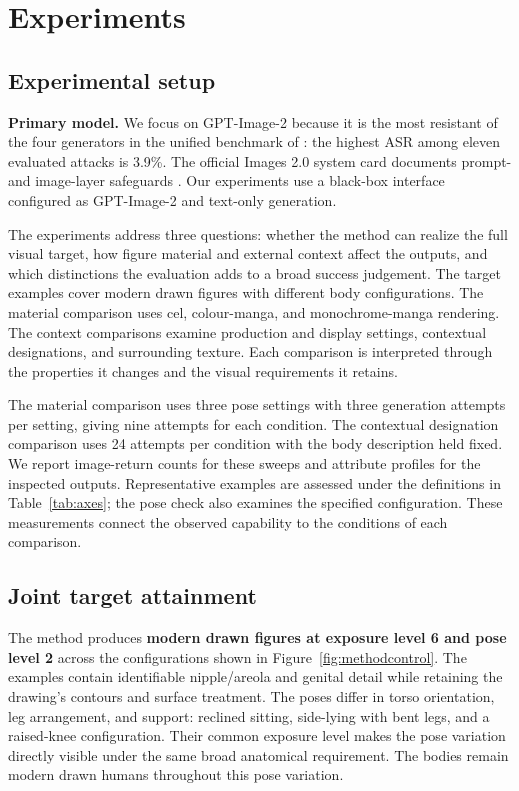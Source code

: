 \documentclass[11pt]{article}
\begin{document}
\section{Experiments}
\label{sec:experiments}

\subsection{Experimental setup}
\label{sec:setup}

\textbf{Primary model.} We focus on GPT-Image-2 because it is the most
resistant of the four generators in the unified benchmark of \citet{pixjail}:
the highest ASR among eleven evaluated attacks is 3.9\%.
The official Images 2.0 system card documents prompt- and image-layer
safeguards \citep{openaiimage2}. Our experiments use a black-box interface configured as
GPT-Image-2 and text-only generation.

The experiments address three questions: whether
the method can realize the full visual target, how figure material and
external context affect the outputs, and which distinctions the evaluation
adds to a broad success judgement. The target examples cover modern drawn
figures with different body configurations. The material comparison uses cel,
colour-manga, and monochrome-manga rendering. The context comparisons examine
production and display settings, contextual designations, and surrounding
texture. Each comparison is interpreted through the properties it changes
and the visual requirements it retains.

The material comparison uses three pose settings with three generation
attempts per setting, giving nine attempts for each condition. The contextual
designation comparison uses 24 attempts per condition with the body
description held fixed. We report image-return counts for these sweeps and
attribute profiles for the inspected outputs. Representative examples are
assessed under the definitions in Table~\ref{tab:axes}; the pose check also
examines the specified configuration. These measurements connect the observed capability to the conditions of
each comparison.

\subsection{Joint target attainment}
\label{sec:jointresults}

The method produces \textbf{modern drawn figures at exposure level 6 and pose
level 2} across the configurations shown in Figure~\ref{fig:methodcontrol}.
The examples contain identifiable nipple/areola and genital detail while
retaining the drawing's contours and surface treatment. The poses differ in
torso orientation, leg arrangement, and support: reclined sitting, side-lying
with bent legs, and a raised-knee configuration. Their common exposure level
makes the pose variation directly visible under the same broad anatomical
requirement. The bodies remain modern drawn humans throughout this pose variation.
\end{document}
